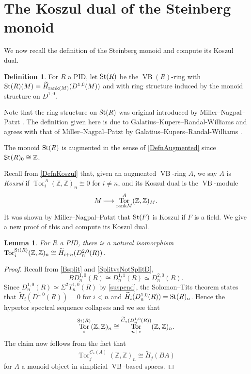 \documentclass[a4paper]{amsart}
\DeclareMathOperator{\Tor}{Tor}
\DeclareMathOperator{\VB}{VB}
\newcommand{\Z}{\mathbb{Z}}
\numberwithin{theoremcounter}{section}
\newtheorem{lemma}[lemmaauto]{Lemma}
\theoremstyle{definition}
\newtheorem{definition}[Defauto]{Definition}
\theoremstyle{remark}
\newcommand{\mr}[1]{{\rm #1}}
\newcommand{\rank}{\mr{rank}}
\newcommand{\St}{\mr{St}}
\begin{document}
\section{The Koszul dual of the Steinberg monoid} 


We now recall the definition of the Steinberg monoid and compute its Koszul dual.

\begin{definition}
For $R$ a PID, let $\St(R)$ be the $\VB(R)$-ring with $\St(R)(M)=\widetilde H_{\rank(M)}(D^{1,0}(M))$ and with ring structure induced by the monoid structure on $D^{1,0}$. 
\end{definition} 

Note that the ring structure on $\St(R)$ was original introduced by Miller--Nagpal--Patzt \cite[Section 2.3]{MNP}. The definition given here is due to Galatius--Kupers--Randal-Williams \cite[Lemma 6.6]{e2cellsIV} and agrees with that of Miller--Nagpal--Patzt  by Galatius--Kupers--Randal-Williams \cite[Remark 6.7]{e2cellsIV}.

The monoid $\St(R)$ is augmented in the sense of \autoref{DefnAugmented} since $\St(R)_0 \cong \Z$. 

Recall from \autoref{DefnKoszul} that, given an augmented $\VB$-ring $A$, we say $A$ is \emph{Koszul} if $\Tor_i^{A}(\Z,\Z)_n \cong 0$ for $i \neq n$, and its Koszul dual is the  $\VB$-module $$M \longmapsto \Tor_{\rank M}^{A}(\Z,\Z)_M.$$
It was shown by Miller--Nagpal--Patzt \cite[Theorem 1.4]{MNP} that $\St(F)$ is Koszul if $F$ is a field. We give a new proof of this and compute its Koszul dual. 

\begin{lemma} \label{TorD}
For $R$ a PID, there is a natural isomorphism $\Tor_i^{\St(R)}(\Z,\Z)_n \cong \widetilde H_{i+n}(D^{2,0}_n(R))$.    
\end{lemma}

\begin{proof}
Recall from \autoref{Bsplit} and \autoref{SplitvsNotSplitD}, $$B D^{1,0}_n(R) \cong D^{1,1}_n(R) \simeq D^{2,0}_n(R).$$  Since $D^{1,0}_n(R) \simeq \Sigma^2 T^{1,0}_n(R)$ by \autoref{suspend}, the Solomon--Tits theorem states that $\widetilde H_i ( D^{1,0}(R) ) =0$ for $i<n$ and $\widetilde H_i ( D^{1,0}_n(R) ) = \St(R)_n$. Hence the hypertor spectral sequence collapses and we see that $$\Tor_i^{\St(R)}(\Z,\Z)_n \cong \Tor_{n+i}^{\widetilde C_*(D^{1,0}_n(R)) }(\Z,\Z)_n.$$ The claim now follows from the fact that $$\Tor_{j}^{\widetilde C_*( A) }(\Z,\Z)_n \cong \widetilde H_j(B A)$$ for $A$ a monoid object in simplicial $\VB$-based spaces. 
\end{proof}
\end{document}
